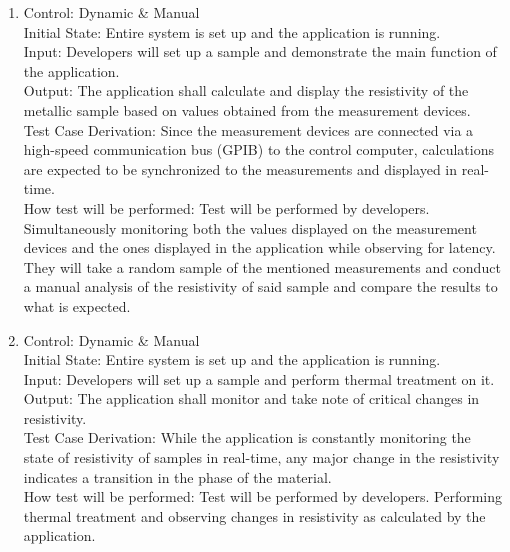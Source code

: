 \documentclass[12pt, titlepage]{article}
\begin{document}
\begin{enumerate}[{FR-T}1.]
    \item Control: Dynamic \& Manual\\
    Initial State: Entire system is set up and the application is running.\\
    Input: Developers will set up a sample and demonstrate the main function of the application.\\
    Output: The application shall calculate and display the resistivity of the metallic sample based on values obtained from the measurement devices.\\
    Test Case Derivation: Since the measurement devices are connected via a high-speed communication bus (GPIB) to the control computer, calculations are expected to be synchronized to the measurements and displayed in real-time.\\
    How test will be performed: Test will be performed by developers. Simultaneously monitoring both the values displayed on the measurement devices and the ones displayed in the application while observing for latency. They will take a random sample of the mentioned measurements and conduct a manual analysis of the resistivity of said sample and compare the results to what is expected.
    
    \item Control: Dynamic \& Manual\\
    Initial State: Entire system is set up and the application is running.\\
    Input: Developers will set up a sample and perform thermal treatment on it.\\
    Output: The application shall monitor and take note of critical changes in resistivity.\\
    Test Case Derivation: While the application is constantly monitoring the state of resistivity of samples in real-time, any major change in the resistivity indicates a transition in the phase of the material.\\
How test will be performed: Test will be performed by developers. Performing thermal treatment and observing changes in resistivity as calculated by the application.
    

\end{enumerate}
\end{document}
